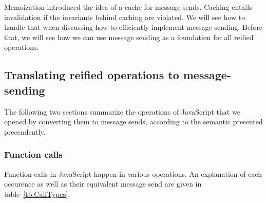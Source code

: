 Memoization introduced the idea of a cache for message sends. Caching entails
invalidation if the invariants behind caching are violated. We will see how to
handle that when discussing how to efficiently implement message sending.
Before that, we will see how we can use message sending as a foundation for all
reified operations.

\subsection{Translating reified operations to message-sending}

The following two sections summarize the operations of JavaScript that we
opened by converting them to message sends, according to the semantic presented
precendently.

\subsubsection{Function calls}

Function calls in JavaScript happen in various operations. An explanation of
each occurence as well as their equivalent message send are given in
table~\ref{tb:CallTypes}.

